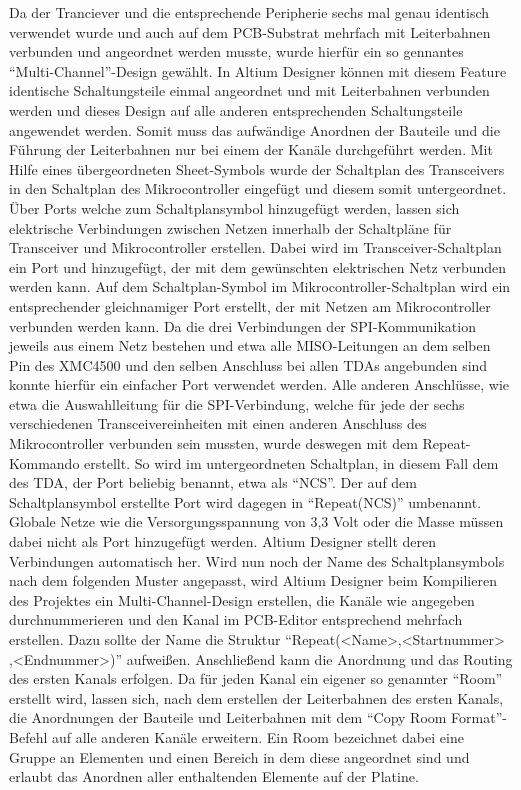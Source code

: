 Da der Tranciever und die entsprechende Peripherie sechs mal genau identisch verwendet wurde und auch auf dem \ac{PCB}-Substrat mehrfach mit Leiterbahnen verbunden und angeordnet werden musste, wurde hierfür ein so gennantes \enquote{Multi-Channel}-Design gewählt. In Altium Designer können mit diesem Feature identische Schaltungsteile einmal angeordnet und mit Leiterbahnen verbunden werden und dieses Design auf alle anderen entsprechenden Schaltungsteile angewendet werden. Somit muss das aufwändige Anordnen der Bauteile und die Führung der Leiterbahnen nur bei einem der Kanäle durchgeführt werden.  Mit Hilfe eines übergeordneten Sheet-Symbols wurde der Schaltplan des Transceivers in den Schaltplan des Mikrocontroller eingefügt und diesem somit untergeordnet. Über Ports welche zum  Schaltplansymbol hinzugefügt werden, lassen sich elektrische Verbindungen zwischen Netzen innerhalb der Schaltpläne für Transceiver  und Mikrocontroller erstellen. Dabei wird im Transceiver-Schaltplan ein Port und hinzugefügt, der mit dem gewünschten elektrischen Netz  verbunden werden kann. Auf dem Schaltplan-Symbol im Mikrocontroller-Schaltplan wird ein entsprechender gleichnamiger Port erstellt, der mit Netzen am Mikrocontroller verbunden werden kann. Da die drei Verbindungen der \ac{SPI}-Kommunikation jeweils aus einem Netz bestehen und etwa alle \acs{MISO}-Leitungen an dem selben Pin des XMC4500 und den selben Anschluss bei allen TDAs angebunden sind konnte hierfür ein einfacher Port verwendet werden. Alle anderen Anschlüsse, wie etwa die Auswahlleitung für die \ac{SPI}-Verbindung, welche für jede der sechs verschiedenen Transceivereinheiten mit einen anderen Anschluss des Mikrocontroller verbunden sein mussten, wurde deswegen mit dem Repeat-Kommando erstellt. So wird im untergeordneten Schaltplan, in diesem Fall dem des TDA, der Port beliebig benannt, etwa als \enquote{NCS}. Der auf dem Schaltplansymbol erstellte Port wird dagegen in \enquote{Repeat(NCS)} umbenannt. Globale Netze wie die Versorgungsspannung von 3,3 Volt oder die Masse müssen dabei nicht als Port hinzugefügt werden. Altium Designer stellt deren Verbindungen automatisch her. Wird nun noch der Name des Schaltplansymbols nach dem folgenden Muster angepasst, wird Altium Designer beim Kompilieren des Projektes ein Multi-Channel-Design erstellen, die Kanäle wie angegeben durchnummerieren und den Kanal im \ac{PCB}-Editor entsprechend mehrfach erstellen. Dazu sollte der Name die Struktur \enquote{Repeat(<Name>,<Startnummer> ,<Endnummer>)} aufweißen. Anschließend kann die Anordnung und das Routing des ersten Kanals erfolgen. Da für jeden Kanal ein eigener so genannter \enquote{Room} erstellt wird, lassen sich, nach dem erstellen der Leiterbahnen des ersten Kanals, die Anordnungen der Bauteile und Leiterbahnen mit dem \enquote{Copy Room Format}-Befehl auf alle anderen Kanäle erweitern. Ein Room bezeichnet dabei eine Gruppe an Elementen und einen Bereich in dem diese angeordnet sind und erlaubt das Anordnen aller enthaltenden Elemente auf der Platine.  %


